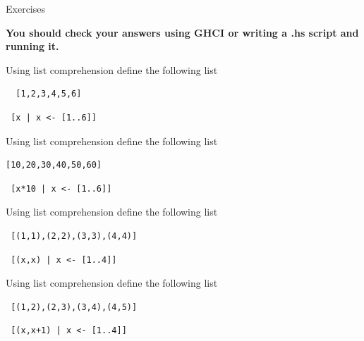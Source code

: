 \documentclass{article}
\newcommand\fullExTitle{Exercises}
\begin{document}
\begin{Huge}
	\begin{center}
	\fullExTitle
	\end{center}
\end{Huge}
\begin{large}
  \textbf{You should check your answers using GHCI or writing a .hs script and running it.}
\end{large}
\begin{Exercise}
Using list comprehension define the following list
\begin{lstlisting}
  [1,2,3,4,5,6]
\end{lstlisting}
\end{Exercise}
\begin{Answer}
\begin{lstlisting}
 [x | x <- [1..6]]
\end{lstlisting}
\end{Answer}
\begin{Exercise}
Using list comprehension define the following list
\begin{lstlisting}
[10,20,30,40,50,60]
\end{lstlisting}
\end{Exercise}
\begin{Answer}
\begin{lstlisting}
 [x*10 | x <- [1..6]]
\end{lstlisting}
\end{Answer}
\begin{Exercise}
Using list comprehension define the following list
\begin{lstlisting}
 [(1,1),(2,2),(3,3),(4,4)]
\end{lstlisting}
\end{Exercise}
\begin{Answer}
\begin{lstlisting}
 [(x,x) | x <- [1..4]]
\end{lstlisting}
\end{Answer}
\begin{Exercise}
Using list comprehension define the following list
\begin{lstlisting}
 [(1,2),(2,3),(3,4),(4,5)]
\end{lstlisting}
\end{Exercise}
\begin{Answer}
\begin{lstlisting}
 [(x,x+1) | x <- [1..4]]
\end{lstlisting}
\end{Answer}
\end{document}
